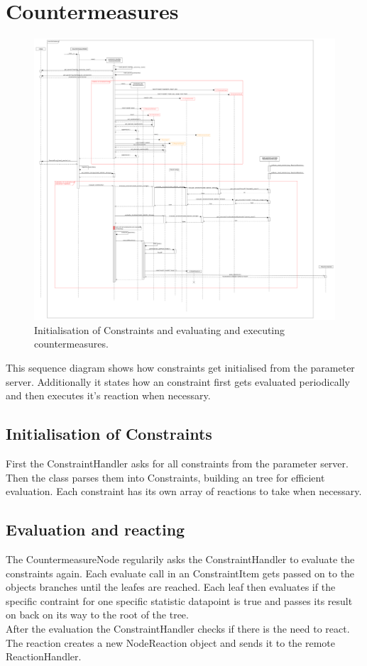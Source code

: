 \section{Countermeasures} 
\begin{figure}[!ht] 
	\begin{center} 
		\includegraphics[width=1.0\linewidth]{./diagram_pictures/reactor/reactor_seq.pdf} 
		\caption{Initialisation of Constraints and evaluating and executing countermeasures.} 
	\end{center} 
\end{figure}
This sequence diagram shows how constraints get initialised from the parameter server. Additionally it states how an constraint first gets evaluated periodically and then executes it's reaction when necessary.
\subsection*{Initialisation of Constraints}
First the ConstraintHandler asks for all constraints from the parameter server. Then the class parses them into Constraints, building an tree for efficient evaluation. Each constraint has its own array of reactions to take when necessary.

\subsection*{Evaluation and reacting}
The CountermeasureNode regularily asks the ConstraintHandler to evaluate the constraints again. Each evaluate call in an ConstraintItem gets passed on to the objects branches until the leafes are reached. Each leaf then evaluates if the specific contraint for one specific statistic datapoint is true and passes its result on back on its way to the root of the tree.\\
After the evaluation the ConstraintHandler checks if there is the need to react. The reaction creates a new NodeReaction object and sends it to the remote ReactionHandler.


